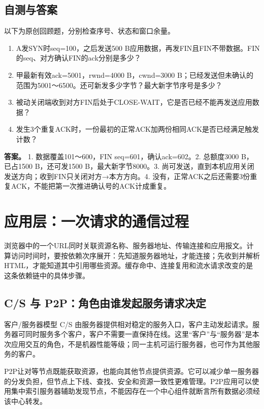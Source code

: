 \section{自测与答案}\label{cn-ch5-review}

以下为原创回顾题，分别检查序号、状态和窗口余量。

\begin{enumerate}
\def\labelenumi{\arabic{enumi}.}
\tightlist
\item
  A发SYN时seq=100，之后发送500 B应用数据，再发FIN且FIN不带数据。FIN的seq、对方确认FIN的ack分别是多少？
\item
  甲最新有效ack=5001，rwnd=4000 B，cwnd=3000 B；已经发送但未确认的范围为5001～6500。还可新发多少字节？最大新字节序号是多少？
\item
  被动关闭端收到对方FIN后处于CLOSE-WAIT，它是否已经不能再发送应用数据？
\item
  发生3个重复ACK时，一份最初的正常ACK加两份相同ACK是否已经满足触发计数？
\end{enumerate}

\textbf{答案。} 1. 数据覆盖101～600，FIN seq=601，确认ack=602。2. 总额度3000 B，已占1500 B，还可发1500 B，最大新字节8000。3. 尚可发送，直到本机应用关闭发送方向；收到FIN只关闭对方→本方方向。4. 没有，正常ACK之后还需要3份重复ACK，不能把第一次推进确认号的ACK计成重复。

\chapter{应用层：一次请求的通信过程}\label{cn-ch6}

浏览器中的一个URL同时关联资源名称、服务器地址、传输连接和应用报文。计算访问时间时，要按依赖次序展开：先知道服务器地址，才能连接；先收到并解析HTML，才能知道其中引用哪些资源。缓存命中、连接复用和流水请求改变的是这条依赖链中的具体步骤。

\section{C/S 与 P2P：角色由谁发起服务请求决定}\label{cn-06-01}

客户/服务器模型 C/S 由服务器提供相对稳定的服务入口，客户主动发起请求。服务器可同时服务多个客户，客户不需要一直保持在线。这里``客户''与``服务器''是本次应用交互的角色，不是机器性能等级；同一主机可运行服务器，也可作为其他服务的客户。

P2P让对等节点既能获取资源，也能向其他节点提供资源。它可以减少单一服务器的分发负担，但节点上下线、查找、安全和资源一致性更难管理。P2P应用可以使用集中索引服务器辅助发现节点，不能因存在一个中心组件就断言所有数据必须经该中心转发。

